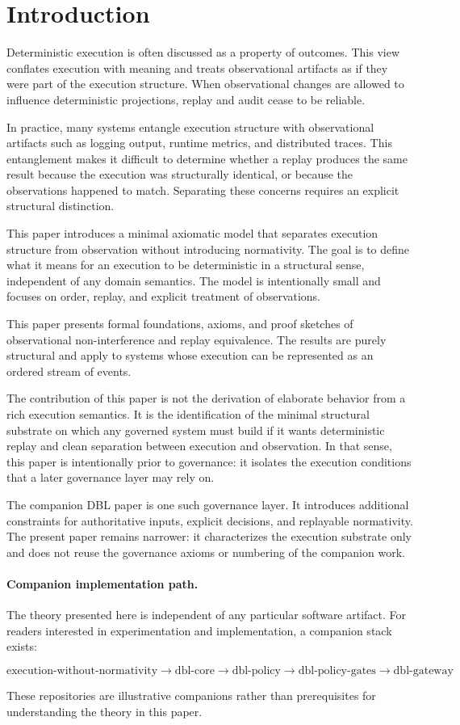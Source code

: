 \section{Introduction}

Deterministic execution is often discussed as a property of outcomes. This view conflates execution with meaning and treats observational artifacts as if they were part of the execution structure. When observational changes are allowed to influence deterministic projections, replay and audit cease to be reliable.

In practice, many systems entangle execution structure with observational artifacts such as logging output, runtime metrics, and distributed traces. This entanglement makes it difficult to determine whether a replay produces the same result because the execution was structurally identical, or because the observations happened to match. Separating these concerns requires an explicit structural distinction.

This paper introduces a minimal axiomatic model that separates execution structure from observation without introducing normativity. The goal is to define what it means for an execution to be deterministic in a structural sense, independent of any domain semantics. The model is intentionally small and focuses on order, replay, and explicit treatment of observations.

This paper presents formal foundations, axioms, and proof sketches of observational non-interference and replay equivalence. The results are purely structural and apply to systems whose execution can be represented as an ordered stream of events.

The contribution of this paper is not the derivation of elaborate behavior from a rich execution semantics. It is the identification of the minimal structural substrate on which any governed system must build if it wants deterministic replay and clean separation between execution and observation. In that sense, this paper is intentionally prior to governance: it isolates the execution conditions that a later governance layer may rely on.

The companion DBL paper is one such governance layer. It introduces additional constraints for authoritative inputs, explicit decisions, and replayable normativity. The present paper remains narrower: it characterizes the execution substrate only and does not reuse the governance axioms or numbering of the companion work.

\paragraph{Companion implementation path.}
The theory presented here is independent of any particular software artifact. For readers interested in experimentation and implementation, a companion stack exists:

\[
\text{execution-without-normativity}
\rightarrow \text{dbl-core}
\rightarrow \text{dbl-policy}
\rightarrow \text{dbl-policy-gates}
\rightarrow \text{dbl-gateway}
\]

These repositories are illustrative companions rather than prerequisites for understanding the theory in this paper.
